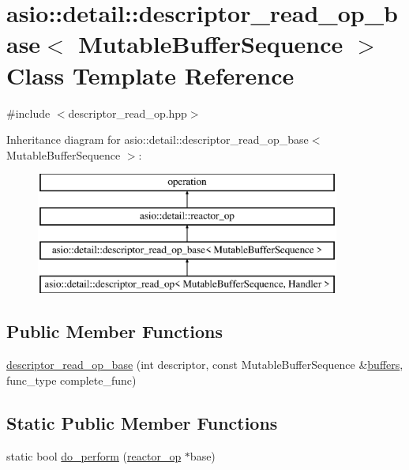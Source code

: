 \hypertarget{classasio_1_1detail_1_1descriptor__read__op__base}{}\section{asio\+:\+:detail\+:\+:descriptor\+\_\+read\+\_\+op\+\_\+base$<$ Mutable\+Buffer\+Sequence $>$ Class Template Reference}
\label{classasio_1_1detail_1_1descriptor__read__op__base}


{\ttfamily \#include $<$descriptor\+\_\+read\+\_\+op.\+hpp$>$}

Inheritance diagram for asio\+:\+:detail\+:\+:descriptor\+\_\+read\+\_\+op\+\_\+base$<$ Mutable\+Buffer\+Sequence $>$\+:\begin{figure}[H]
\begin{center}
\leavevmode
\includegraphics[height=4.000000cm]{classasio_1_1detail_1_1descriptor__read__op__base}
\end{center}
\end{figure}
\subsection*{Public Member Functions}
\begin{DoxyCompactItemize}
\item 
\hyperlink{classasio_1_1detail_1_1descriptor__read__op__base_a86176fbadcdbedfa8ca1eeb7e76c3746}{descriptor\+\_\+read\+\_\+op\+\_\+base} (int descriptor, const Mutable\+Buffer\+Sequence \&\hyperlink{group__async__read_ga54dede45c3175148a77fe6635222c47d}{buffers}, func\+\_\+type complete\+\_\+func)
\end{DoxyCompactItemize}
\subsection*{Static Public Member Functions}
\begin{DoxyCompactItemize}
\item 
static bool \hyperlink{classasio_1_1detail_1_1descriptor__read__op__base_a25af56c711244e28b14cacec36262586}{do\+\_\+perform} (\hyperlink{classasio_1_1detail_1_1reactor__op}{reactor\+\_\+op} $\ast$base)
\end{DoxyCompactItemize}
